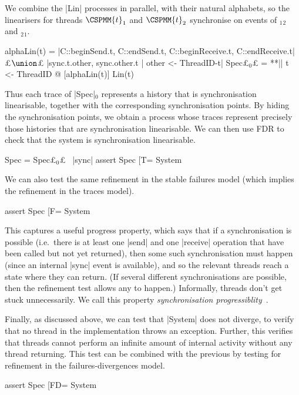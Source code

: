 We combine the |Lin| processes in parallel, with their natural
alphabets, so the linearisers for threads $\CSPMM{t}_1$ and $\CSPMM{t}_2$
synchronise on events of $_1$$_2$ and
$_2$$_1$.  
%
\begin{cspm}
alphaLin(t) =
  {|C::beginSend.t, C::endSend.t, C::beginReceive.t, C::endReceive.t|} £$\union$£
  {|sync.t.other, sync.other.t | other <- ThreadID-{t}|}
Spec£$_0$£ = **|| t <- ThreadID @ [alphaLin(t)] Lin(t)
\end{cspm} %
%
Thus each trace of |Spec|$_0$ represents a history that is synchronisation
linearisable, together with the corresponding synchronisation points.  By
hiding the synchronisation points, we obtain a process whose traces represent
precisely those histories that are synchronisation linearisable.  We can then
use FDR to check that the system is synchronisation linearisable. 
%
\begin{cspm}
Spec = Spec£$_0$£ \ {|sync|}
assert Spec [T= System
\end{cspm}

We can also test the same refinement in the stable failures model (which
implies the refinement in the traces model).
%
\begin{cspm}
assert Spec [F= System
\end{cspm}
%
This captures a useful progress property, which says that if a synchronisation
is possible (i.e.~there is at least one |send| and one |receive| operation
that have been called but not yet returned), then some such synchronisation
must happen (since an internal |sync| event is available), and so the relevant
threads reach a state where they can return.  (If several different
synchronisations are possible, then the refinement test allows any to happen.)
Informally, threads don't get stuck unnecessarily.  We call this property
\emph{synchronisation progressiblity}~\cite{LL:synchronisation}.

Finally, as discussed above, we can test that |System| does not diverge, to
verify that no thread in the implementation throws an exception.  Further,
this verifies that threads cannot perform an infinite amount of internal
activity without any thread returning.  This test can be combined with the
previous by testing for refinement in the failures-divergences model.
%
\begin{cspm}
assert Spec [FD= System
\end{cspm}

